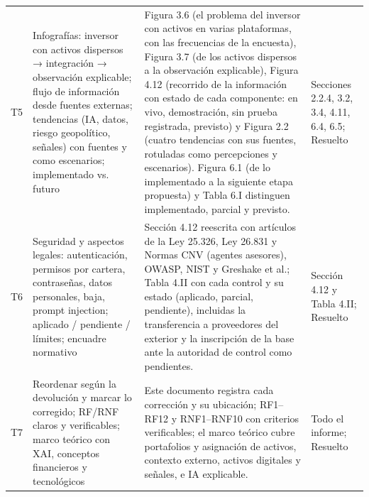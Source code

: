 \documentclass[a4paper,11pt]{article}
\newcommand{\ok}{\textcolor{green!45!black}{Resuelto}}
\begin{document}
\begin{longtable}{>{\raggedright\arraybackslash}p{0.6cm}>{\raggedright\arraybackslash}p{4.6cm}>{\raggedright\arraybackslash}p{8.0cm}>{\raggedright\arraybackslash}p{3.3cm}}
T5 & Infografías: inversor con activos dispersos → integración → observación explicable; flujo de información desde fuentes externas; tendencias (IA, datos, riesgo geopolítico, señales) con fuentes y como escenarios; implementado vs. futuro & Figura 3.6 (el problema del inversor con activos en varias plataformas, con las frecuencias de la encuesta), Figura 3.7 (de los activos dispersos a la observación explicable), Figura 4.12 (recorrido de la información con estado de cada componente: en vivo, demostración, sin prueba registrada, previsto) y Figura 2.2 (cuatro tendencias con sus fuentes, rotuladas como percepciones y escenarios). Figura 6.1 (de lo implementado a la siguiente etapa propuesta) y Tabla 6.I distinguen implementado, parcial y previsto. & Secciones 2.2.4, 3.2, 3.4, 4.11, 6.4, 6.5; \ok\\
T6 & Seguridad y aspectos legales: autenticación, permisos por cartera, contraseñas, datos personales, baja, prompt injection; aplicado / pendiente / límites; encuadre normativo & Sección 4.12 reescrita con artículos de la Ley 25.326, Ley 26.831 y Normas CNV (agentes asesores), OWASP, NIST y Greshake et al.; Tabla 4.II con cada control y su estado (aplicado, parcial, pendiente), incluidas la transferencia a proveedores del exterior y la inscripción de la base ante la autoridad de control como pendientes. & Sección 4.12 y Tabla 4.II; \ok\\
T7 & Reordenar según la devolución y marcar lo corregido; RF/RNF claros y verificables; marco teórico con XAI, conceptos financieros y tecnológicos & Este documento registra cada corrección y su ubicación; RF1--RF12 y RNF1--RNF10 con criterios verificables; el marco teórico cubre portafolios y asignación de activos, contexto externo, activos digitales y señales, e IA explicable. & Todo el informe; \ok\\
\bottomrule
\end{longtable}
\end{document}
